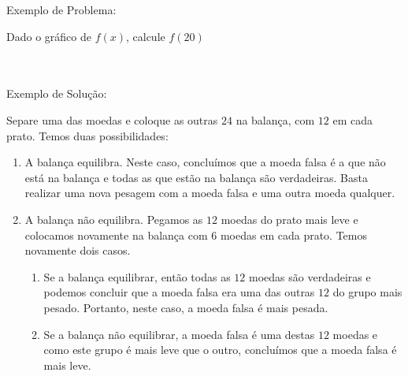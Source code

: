 

\pagestyle{empty}


Exemplo de Problema:
\begin{prob}
    Dado o gráfico de $f\left( x\right)$, calcule $f\left( 20\right)$


\end{prob}
\\\\

Exemplo de Solução:
\begin{solu}
    Separe uma das moedas e coloque as outras $24$ na balança, com $12$ em cada prato. Temos duas possibilidades:
    \begin{enumerate}[(1)]
        \item
            A balança equilibra. Neste caso, concluímos que a moeda falsa é a que não está na balança e todas as que estão na balança são verdadeiras. Basta realizar uma nova pesagem com a moeda falsa e uma outra moeda qualquer.
        \item
            A balança não equilibra. Pegamos as $12$ moedas do prato mais leve e colocamos novamente na balança com $6$ moedas em cada prato. Temos novamente dois casos.
        \begin{enumerate}
            \item
                Se a balança equilibrar, então todas as $12$ moedas são verdadeiras e podemos  concluir que a moeda falsa era uma das outras $12$ do grupo mais pesado. Portanto, neste caso, a moeda  falsa é mais pesada.
            \item
                Se a balança não equilibrar, a moeda falsa é uma destas $12$ moedas e como este grupo é mais leve que o outro, concluímos que a moeda falsa é mais leve.
        \end{enumerate}
    \end{enumerate}
\end{solu}

